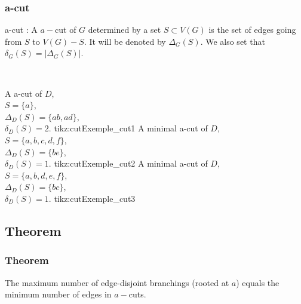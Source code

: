\documentclass[8pt]{beamer}
\begin{document}
\begin{frame}
\frametitle{a-cut}

\begin{block}{a-cut :}
A $a-$cut of $G$ determined by a set $S \subset V(G)$ is the set of
edges going from $S$ to $V(G) - S$. 
It will be denoted by $\Delta_G(S)$.
We also set that $\delta_G(S) = |\Delta_G(S)|$.
\end{block}
~

\threesplitpage
{
    {A a-cut of $D$,\\ $S = \{a\}$,\\ $\Delta_D(S)=\{ab, ad\}$,\\ $\delta_D(S) = 2$.}
    {tikz:cutExemple_cut1}
}{
    {A minimal a-cut of $D$,\\ $S = \{a, b, c, d, f\}$,\\ $\Delta_D(S)=\{be\}$,\\ $\delta_D(S) = 1$.}
    {tikz:cutExemple_cut2}
}{
    {A minimal a-cut of $D$,\\ $S = \{a, b, d, e, f\}$,\\ $\Delta_D(S)=\{bc\}$,\\ $\delta_D(S) = 1$.}
    {tikz:cutExemple_cut3}
}
\end{frame}

\subsection{Theorem}
\begin{frame}
\frametitle{Theorem}

\begin{edmonds_theorem}[Edmonds]
The maximum number of edge-disjoint branchings (rooted at $a$) 
equals the minimum number of edges in $a-$cuts.
\end{edmonds_theorem}
\end{frame}

\end{document}
